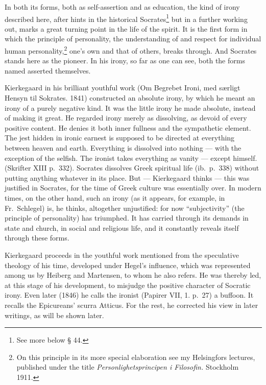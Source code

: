 \documentclass[12pt]{book}
\newcommand{\opage}[1]{\marginnote{\footnotesize\textit{[#1]}}}
\begin{document}
In both its forms, both as self-assertion and as \opage{64}education, the kind of
irony described here, after hints in the historical Socrates\footnote{See more
below § 44.} but in a further working out, marks a great turning point in the life
of the spirit. It is the first form in which the principle of personality, the
understanding of and respect for individual human personality,\footnote{On this
principle in its more special elaboration see my Helsingfors lectures, published
under the title \textit{Personlighetsprincipen i Filosofin.} Stockholm 1911.}
one's own and that of others, breaks through. And Socrates stands here as the
pioneer. In his irony, so far as one can see, both the forms named asserted
themselves.

Kierkegaard in his brilliant youthful work (Om Begrebet Ironi, med særligt Hensyn
til Sokrates. 1841) constructed an absolute irony, by which he meant an irony of a
purely negative kind. It was the little irony he made absolute, instead of making
it great. He regarded irony merely as dissolving, as devoid of every positive
content. He denies it both inner fullness and the sympathetic element. The jest
hidden in ironic earnest is supposed to be directed at everything between heaven
and earth. Everything is dissolved into nothing --- with the exception of the
selfish. The ironist takes everything as vanity --- except himself. (Skrifter XIII
p.~332). Socrates dissolves Greek spiritual life (ib.\ p.~338) without putting
anything whatever in its place. But --- Kierkegaard thinks --- this was justified
in Socrates, for the time of Greek culture was essentially over. In modern times,
on the other hand, such an irony (as it appears, for example, in Fr.~Schlegel) is,
he thinks, altogether unjustified: for now ``subjectivity'' (the principle of
personality) has triumphed. It has carried through its demands in state and church,
in social and religious life, and it constantly reveals itself through these forms.

Kierkegaard proceeds in the youthful work mentioned from the speculative theology of
his time, developed under Hegel's influence, which was represented among us by
Heiberg and Martensen, to whom he also refers. He was thereby led, at this stage of
his development, to misjudge the positive character of Socratic irony. Even later
(1846) he calls the ironist (Papirer VII, 1. p.~27) a buffoon. It recalls the
Epicureans' scurra \opage{65}Atticus. For the rest, he corrected his view in later
writings, as will be shown later.
\end{document}

